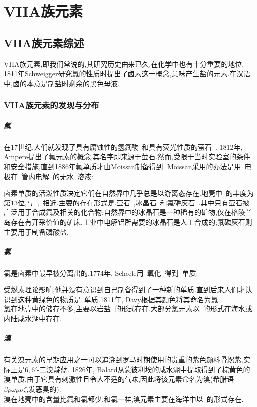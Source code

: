 \documentclass{ctexbook}
\begin{document}
\chapter{VIIA族元素}
\section{VIIA族元素综述}
VIIA族元素,即我们常说的,其研究历史由来已久,在化学中也有十分重要的地位. 1811年Schweigger研究氯的性质时提出了卤素这一概念,意味产生盐的元素.在汉语中,卤的本意是制盐时剩余的黑色母液.
\subsection{VIIA族元素的发现与分布}
\paragraph{氟}
在17世纪,人们就发现了具有腐蚀性的氢氟酸~和具有荧光性质的萤石~. 1812年, Ampere提出了氟元素的概念,其名字即来源于萤石.然而,受限于当时实验室的条件和安全措施,直到1886年氟单质才由Moissan制备得到. Moissan采用的办法是用~电极在~管内电解~的无水~溶液:
\begin{tightcenter}
\end{tightcenter}
\indent 卤素单质的活泼性质决定它们在自然界中几乎总是以游离态存在.地壳中~的丰度为第13位,与~,~相近.主要的存在形式是:萤石~,冰晶石~和氟磷灰石~.其中只有萤石被广泛用于合成氟及相关的化合物;自然界中的冰晶石是一种稀有的矿物,仅在格陵兰岛存在有开采价值的矿床,工业中电解铝所需要的冰晶石是人工合成的;氟磷灰石则主要用于制备磷酸盐.
\paragraph{氯}
氯是卤素中最早被分离出的.1774年, Scheele用~氧化~得到~单质:
\begin{tightcenter}
\end{tightcenter}
受燃素理论影响,他并没有意识到自己制备得到了一种新的单质.直到后来人们才认识到这种黄绿色的物质是~单质.1811年, Davy根据其颜色将其命名为氯.\\
\indent 氯在地壳中的储存不多,主要以岩盐~的形式存在.大部分氯元素以~的形式在海水或内陆咸水湖中存在.
\paragraph{溴}
有关溴元素的早期应用之一可以追溯到罗马时期使用的贵重的紫色颜料骨螺紫,实际上是$6,6'$-二溴靛蓝. 1826年, Balard从蒙彼利埃的咸水湖中提取得到了棕黄色的溴单质.由于它具有刺激性且令人不适的气味,因此将该元素命名为溴(希腊语$\beta\rho\omega\mu o\zeta$,发恶臭的).\\
\indent 溴在地壳中的含量比氟和氯都少.和氯一样,溴元素主要在海洋中以~的形式存在.
\end{document}
